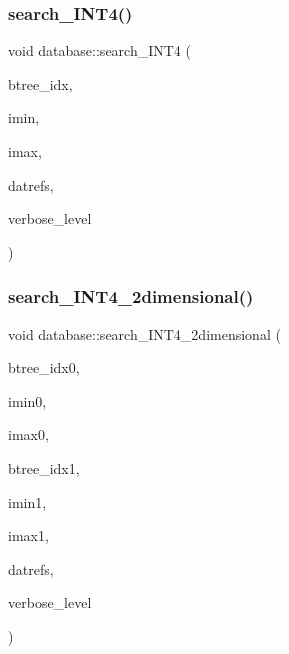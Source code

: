 \mbox{\label{classdatabase_aeda62e67888923cd968674ec2ed08007}} 
\subsubsection{\texorpdfstring{search\+\_\+\+I\+N\+T4()}{search\_INT4()}}
{\footnotesize\ttfamily void database\+::search\+\_\+\+I\+N\+T4 (\begin{DoxyParamCaption}\item[{\mbox{\hyperlink{galois_8h_a09fddde158a3a20bd2dcadb609de11dc}{I\+NT}}}]{btree\+\_\+idx,  }\item[{\mbox{\hyperlink{galois_8h_a09fddde158a3a20bd2dcadb609de11dc}{I\+NT}}}]{imin,  }\item[{\mbox{\hyperlink{galois_8h_a09fddde158a3a20bd2dcadb609de11dc}{I\+NT}}}]{imax,  }\item[{\mbox{\hyperlink{class_vector}{Vector}} \&}]{datrefs,  }\item[{\mbox{\hyperlink{galois_8h_a09fddde158a3a20bd2dcadb609de11dc}{I\+NT}}}]{verbose\+\_\+level }\end{DoxyParamCaption})}

\mbox{\label{classdatabase_a10e70413e55aca54a2fe1b02066e3947}} 
\subsubsection{\texorpdfstring{search\+\_\+\+I\+N\+T4\+\_\+2dimensional()}{search\_INT4\_2dimensional()}}
{\footnotesize\ttfamily void database\+::search\+\_\+\+I\+N\+T4\+\_\+2dimensional (\begin{DoxyParamCaption}\item[{\mbox{\hyperlink{galois_8h_a09fddde158a3a20bd2dcadb609de11dc}{I\+NT}}}]{btree\+\_\+idx0,  }\item[{\mbox{\hyperlink{galois_8h_a09fddde158a3a20bd2dcadb609de11dc}{I\+NT}}}]{imin0,  }\item[{\mbox{\hyperlink{galois_8h_a09fddde158a3a20bd2dcadb609de11dc}{I\+NT}}}]{imax0,  }\item[{\mbox{\hyperlink{galois_8h_a09fddde158a3a20bd2dcadb609de11dc}{I\+NT}}}]{btree\+\_\+idx1,  }\item[{\mbox{\hyperlink{galois_8h_a09fddde158a3a20bd2dcadb609de11dc}{I\+NT}}}]{imin1,  }\item[{\mbox{\hyperlink{galois_8h_a09fddde158a3a20bd2dcadb609de11dc}{I\+NT}}}]{imax1,  }\item[{\mbox{\hyperlink{class_vector}{Vector}} \&}]{datrefs,  }\item[{\mbox{\hyperlink{galois_8h_a09fddde158a3a20bd2dcadb609de11dc}{I\+NT}}}]{verbose\+\_\+level }\end{DoxyParamCaption})}

